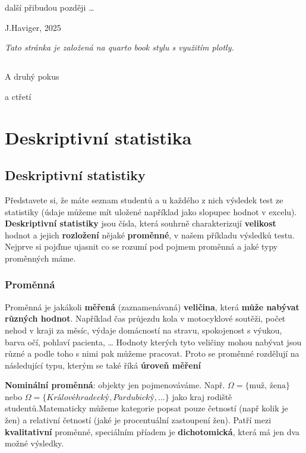 \documentclass[
  czech,
  11pt,
  letterpaper,
  DIV=11,
  numbers=noendperiod]{scrreprt}
\begin{document}
další přibudou později \ldots{}

J.Haviger, 2025

\emph{Tato stránka je založená na quarto book stylu s využitím plotly.}


\chapter{}\label{section}

A druhý pokus

a ctřetí

\part{\textbf{Deskriptivní statistika}}

\chapter{Deskriptivní statistiky}\label{deskriptivnuxed-statistiky}

Představete si, že máte seznam studentů a u každého z nich výsledek test
ze statistiky (údaje můžeme mít uložené například jako slopupec hodnot v
excelu). \textbf{Deskriptivní statistiky} jsou čísla, která souhrně
charakterizují \textbf{velikost} hodnot a jejich \textbf{rozložení}
nějaké \textbf{proměnné}, v našem příkladu výsledků testu. Nejprve si
pojďme ujasnit co se rozumí pod pojmem proměnná a jaké typy proměnných
máme.

\section{Proměnná}\label{promux11bnnuxe1}

Proměnná je jakákoli \textbf{měřená} (zaznamenávaná) \textbf{veličina},
která \textbf{může nabývat různých hodnot}. Například čas průjezdu kola
v motocyklové soutěži, počet nehod v kraji za měsíc, výdaje domácností
na stravu, spokojenost s výukou, barva očí, pohlaví pacienta, \ldots{}
Hodnoty kterých tyto veličiny mohou nabývat jsou různé a podle toho s
nimi pak můžeme pracovat. Proto se proměnné rozdělují na následující
typu, kterým se také říká \textbf{úroveň měření}

\textbf{Nominální proměnná}: objekty jen pojmenováváme. Např.
\(\Omega = \{\text{muž, žena}\}\) nebo
\(\Omega = \{Královéhradecký, Pardubický, ...\}\) jako kraj rodiště
studentů.Matematicky můžeme kategorie popsat pouze četností (např kolik
je žen) a relativní četností (jaké je procentuální zastoupení žen).
Patří mezi \textbf{kvalitativní} proměnné, speciálním příadem je
\textbf{dichotomická}, která má jen dva možné výsledky.
\end{document}
